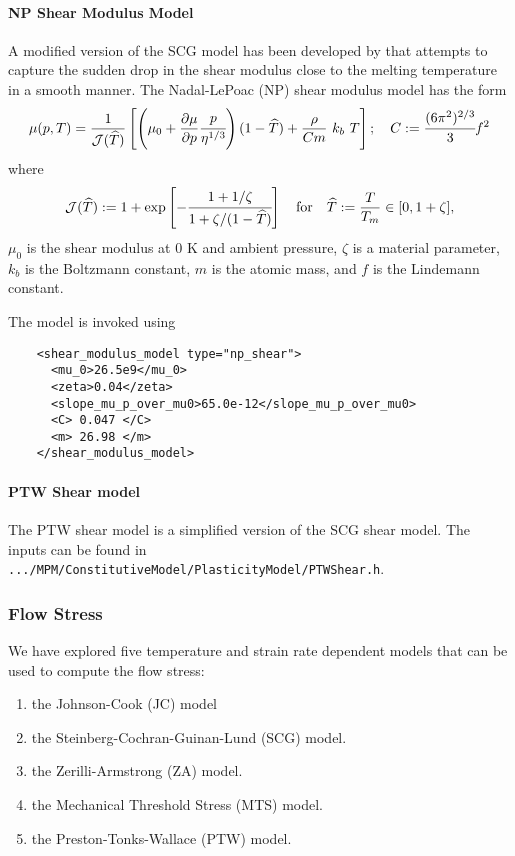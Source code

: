   \paragraph{NP Shear Modulus Model}
  A modified version of the SCG model has been developed by 
  \cite{Nadal03} that attempts to capture the sudden drop in the
  shear modulus close to the melting temperature in a smooth manner.
  The Nadal-LePoac (NP) shear modulus model has the form
  \begin{equation} \label{eq:NPShear}
    \mu(p,T) = \frac{1}{\mathcal{J}(\That)}
      \left[
        \left(\mu_0 + \Partial{\mu}{p} \cfrac{p}{\eta^{1/3}} \right)
        (1 - \That) + \frac{\rho}{Cm}~k_b~T\right]; \quad
    C := \cfrac{(6\pi^2)^{2/3}}{3} f^2
  \end{equation}
  where
  \begin{equation}
    \mathcal{J}(\That) := 1 + \exp\left[-\cfrac{1+1/\zeta}
        {1+\zeta/(1-\That)}\right] \quad
       \text{for} \quad \That:=\frac{T}{T_m}\in[0,1+\zeta],
  \end{equation}
  $\mu_0$ is the shear modulus at 0 K and ambient pressure, $\zeta$ is
  a material parameter, $k_b$ is the Boltzmann constant, $m$ is the atomic
  mass, and $f$ is the Lindemann constant.

  The model is invoked using
  \begin{verbatim}
    <shear_modulus_model type="np_shear">
      <mu_0>26.5e9</mu_0>
      <zeta>0.04</zeta>
      <slope_mu_p_over_mu0>65.0e-12</slope_mu_p_over_mu0>
      <C> 0.047 </C>
      <m> 26.98 </m>
    </shear_modulus_model>
  \end{verbatim}
  
  \paragraph{PTW Shear model}
  The PTW shear model is a simplified version of the SCG shear model.
  The inputs can be found in \verb|.../MPM/ConstitutiveModel/PlasticityModel/PTWShear.h|.

  \subsubsection{Flow Stress}
  We have explored five temperature and strain rate dependent 
  models that can be used to compute the flow stress:
  \begin{enumerate}
    \item the Johnson-Cook (JC) model 
    \item the Steinberg-Cochran-Guinan-Lund (SCG) model. 
    \item the Zerilli-Armstrong (ZA) model.
    \item the Mechanical Threshold Stress (MTS) model. 
    \item the Preston-Tonks-Wallace (PTW) model.
  \end{enumerate}

